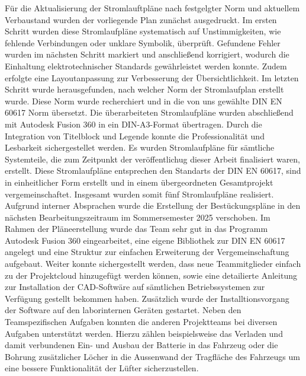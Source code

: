 Für die Aktualisierung der Stromlauftpläne nach festgelgter Norm und aktuellem Verbaustand wurden der vorliegende Plan zunächst ausgedruckt. Im ersten Schritt wurden diese Stromlaufpläne systematisch auf Unstimmigkeiten, wie fehlende Verbindungen oder unklare Symbolik, überprüft. Gefundene Fehler wurden im nächsten Schritt markiert und anschließend korrigiert, wodurch die Einhaltung elektrotechnischer Standards gewährleistet werden konnte. Zudem erfolgte eine Layoutanpassung zur Verbesserung der Übersichtlichkeit. Im letzten Schritt wurde herausgefunden, nach welcher Norm der Stromlaufplan erstellt wurde. Diese Norm wurde recherchiert und in die von uns gewählte DIN EN 60617 Norm \glqq übersetzt\grqq {}. Die überarbeiteten Stromlaufpläne wurden abschließend mit Autodesk Fusion 360 in ein DIN-A3-Format übertragen. Durch die Integration von Titelblock und Legende konnte die Professionalität und Lesbarkeit sichergestellet werden. \newline
Es wurden Stromlaufpläne für sämtliche Systemteile, die zum Zeitpunkt der veröffentlichug dieser Arbeit finalisiert waren, erstellt. Diese Stromlaufpläne entsprechen den Standarts der DIN EN 60617, sind in einheitlicher Form erstellt und in einem übergeordneten Gesamtprojekt vergemeinschaftet. Insgesamt wurden somit fünf Stromlaufpläne realisiert. Aufgrund interner Absprachen wurde die Erstellung der Bestückungspläne in den nächsten Bearbeitungszeitraum im Sommersemester 2025 verschoben. Im Rahmen der Pläneerstellung wurde das Team sehr gut in das Programm Autodesk Fusion 360 eingearbeitet, eine eigene Bibliothek zur DIN EN 60617 angelegt und eine Struktur zur einfachen Erweiterung der Vergemeinschaftung aufgebaut. Weiter konnte sichergestellt werden, dass neue Teammitglieder einfach zu der Projektcloud hinzugefügt werden können, sowie eine detailierte Anleitung zur Installation der CAD-Softwäre auf sämtlichen Betriebssystemen zur Verfügung gestellt bekommen haben. Zusätzlich wurde der Installtionsvorgang der Software auf den laborinternen Geräten gestartet. Neben den Teamspezifischen Aufgaben konnten die anderen Projektteams bei diversen Aufgaben unterstützt werden. Hierzu zählen beispielsweise das Verladen und damit verbundenen Ein- und Ausbau der Batterie in das Fahrzeug oder die Bohrung zusätzlicher Löcher in die Aussenwand der Tragfläche des Fahrzeugs um eine bessere Funktionalität der Lüfter sicherzustellen.




